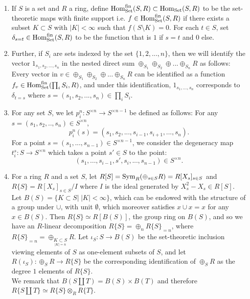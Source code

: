 \begin{enumerate}
\item[(i)] If $S$ is a set and $R$ a ring, define $\operatorname{Hom}^{\mathrm{fin}}_{\mathrm{Set}}(S, R) \subset \operatorname{Hom}_{\mathrm{Set}}(S,R)$ to be the set-theoretic maps with finite support i.e. $f \in \operatorname{Hom}^{\mathrm{fin}}_{\mathrm{Set}}(S, R)$ if there exists a subset $K \subset S$ with $|K| < \infty$ such that $f(S\setminus K) = 0$. For each $t \in S$, set $\delta_{s=t} \in \operatorname{Hom}^{\mathrm{fin}}_{\mathrm{Set}}(S, R)$ to be the function that is $1$ if $s=t$ and $0$ else.
\item[(ii)]Further, if $S_i$ are sets indexed by the set $\{1,2,...,n\}$, then we will identify the vector $1_{s_1,s_2,...,s_n}$ in the nested direct sum $\oplus_{S_1} \oplus_{S_2} \oplus ... \oplus_{S_n} R$ as follows: Every vector in $v \in \oplus_{S_1} \oplus_{S_2} \oplus ... \oplus_{S_n} R$ can be identified as a function $f_{v} \in \operatorname{Hom}^{\mathrm{fin}}_{\mathrm{Set}}(\prod_i S_i, R)$, and under this identification, $1_{s_1,...,s_n}$ corresponds to $\delta_{t=s}$ where $s=(s_1,s_2,...,s_n) \in \prod_i S_i$.
\item[(iii)]For any set $S$, we let $p^n_i: S^{\times n} \to S^{\times n-1}$ be defined as follows: For any $s = (s_1,s_2,..,s_n) \in S^{\times n}$,
\[p^n_i(s) = (s_1,s_2,...,s_{i-1},s_{i+1},...,s_n).\]
For a point $s = (s_1,...,s_{n-1}) \in S^{\times n-1}$, we consider the degeneracy map $t_i^{s}: S \to S^{\times n}$ which takes a point $s' \in S$ to the point:
\[(s_1, ..., s_{i-1}, s', s_{i},...,s_{n-1}) \in S^{\times n}.\]
\item[(iv)] For a ring $R$ and a set $S$, let $R[S]=\operatorname{Sym}_R(\oplus_{s \in S} R) = R[X_s]_{s \in S}$ and $R\{S\} = R[X_s]_{s \in S}/I$ where $I$ is the ideal generated by $X_s^2 - X_s \in R[S]$. \\
\indent Let $B(S) = \{K \subset S| \; |K| < \infty\}$, which can be endowed with the structure of a group under $\cup$, with unit $\emptyset$, which moreover satisfies $x \cup x = x$ for any $x \in B(S)$. Then $R\{S\} \simeq R[B(S)]$, the group ring on $B(S)$, and so we have an $R$-linear decomposition $R\{S\} = \oplus_n R\{S\}_{=n}$, where $R\{S\}_{=n} = \oplus_{\underset{|K|=n}{K\subset S}} R$. Let $\iota_S: S\to B(S)$ be the set-theoretic inclusion viewing elements of $S$ as one-element subsets of $S$, and let $R(\iota_S): \oplus_S R \to R\{S\}$ be the corresponding identification of $\oplus_S R$ as the degree $1$ elements of $R\{S\}$. \\
\indent We remark that $B(S \amalg T) = B(S) \times B(T)$ and therefore $R\{S \amalg T\} \simeq R\{S\} \otimes_R R\{T\}$.

\end{enumerate}
